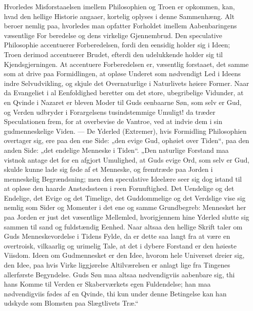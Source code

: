 \documentclass[12pt,a4paper]{book}
\begin{document}
Hvorledes Misforstaaelsen imellem Philosophien og Troen er opkommen, kan, hvad
den hellige Historie angaaer, kortelig oplyses i denne Sammenhæng. Alt beroer
nemlig paa, hvorledes man opfatter Forholdet imellem Aabenbaringens væsentlige
For\-%
beredelse og dens virkelige Gjennembrud. Den speculative Philosophie accentuerer
Forberedelsen, fordi den eensidig holder sig i Ideen; Troen derimod accentuerer
Brudet, efterdi den udelukkende holder sig til Kjendsgjerningen. At accentuere
Forberedelsen er, væsentlig forstaaet, det samme som at drive paa Formidlingen,
at opløse Underet som nødvendigt Led i Ideens indre Selvudvikling, og skjule det
Overnaturlige i Naturlivets høiere Former. Naar da Evangeliet i al Eenfoldighed
beretter om det store, ubegribelige Vidunder, at en Qvinde i Nazaret er bleven
Moder til Guds eenbaarne Søn, som selv er Gud, og Verden udbryder i Forargelsens
tusindstemmige Umuligt! da træder Speculationen frem, for at overbevise de
Vantroe, ved at indvie dem i sin gudmenneskelige Viden. --- De Yderled
(Extremer), hvis Formidling Philosophien overtager sig, ere paa den ene Side:
„den evige Gud, ophøiet over Tiden“, paa den anden Side: „det endelige Menneske
i Tiden“. „Den naturlige Forstand maa vistnok antage det for en afgjort
Umulighed, at Guds evige Ord, som selv er Gud, skulde kunne lade sig føde af et
Menneske, og fremtræde paa Jorden i menneskelig Begrændsning; men den
speculative Ideelære seer sig dog istand til at opløse den haarde Anstødssteen i
reen Fornuftighed. Det Uendelige og det Endelige, det Evige og det Timelige, det
Guddommelige og det Verdslige vise sig nemlig som Sider og Momenter i det ene og
samme Grundbegreb: Mennesket her paa Jorden er just det væsentlige Mellemled,
hvorigjennem hine Yderled slutte sig sammen til sand og fuldstændig Eenhed. Naar
altsaa den hellige Skrift taler om Guds Menneskevordelse i Tidens Fylde, da er
dette saa langt fra at være en overtroisk, vilkaarlig og urimelig Tale, at det i
dybere Forstand er den høieste Viisdom. Ideen om Gudmennesket er den Idee,
hvorom hele Universet dreier sig, den Idee, paa hvis Virke\-%
liggjørelse Altilværelsen er anlagt lige fra Tingenes allerførste Begyndelse.
Guds Søn maa altsaa nødvendigviis aabenbare sig, thi hans Komme til Verden er
Skaberværkets egen Fuldendelse; han maa nødvendigviis fødes af en Qvinde, thi
kun under denne Betingelse kan han udskyde som Blomsten paa Slægtlivets Træ.“
\end{document}
